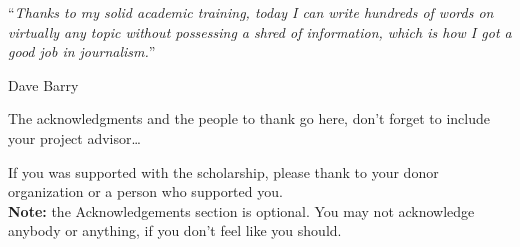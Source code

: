 \documentclass[
11pt, %
oneside, %
ukrainian,
english, %
singlespacing, %
headsepline, %
]{Thesis} %
\begin{document}
\vspace*{0.2\textheight}

\noindent\enquote{\itshape Thanks to my solid academic training, today I can write hundreds of words on virtually any topic without possessing a shred of information, which is how I got a good job in journalism.}\bigbreak

\hfill Dave Barry


\begin{abstract}
\addchaptertocentry{\abstractname} %
The Thesis Abstract is written here (and usually kept to just this page). The page is kept centered vertically so can expand into the blank space above the title too\ldots 
\end{abstract}


\begin{acknowledgements}
\addchaptertocentry{\acknowledgementname} %
The acknowledgments and the people to thank go here, don't forget to include your project advisor\ldots

If you was supported with the scholarship, please thank to your donor organization
or a person who supported you.\\


\noindent \textbf{Note:} the Acknowledgements section is optional. You may not acknowledge anybody or anything, if you don't feel like you should. 

\end{acknowledgements}


\tableofcontents %

\listoffigures %

\listoftables %
\end{document}
